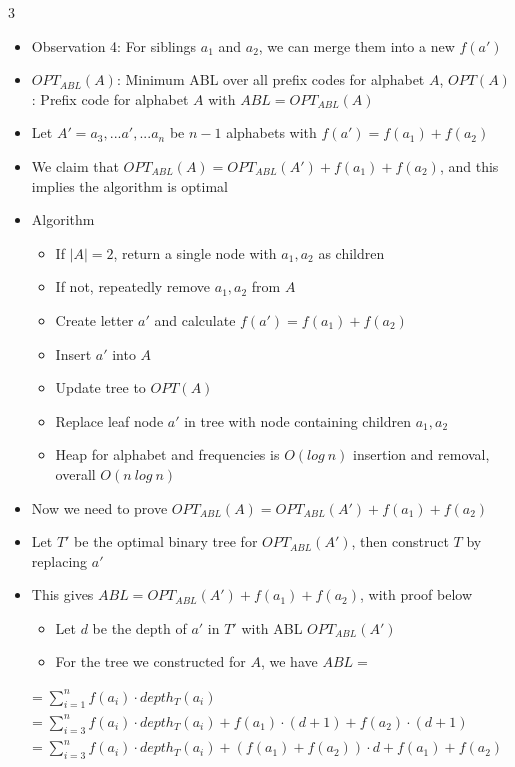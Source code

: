 \documentclass[10pt, landscape]{article}
\begin{document}
\begin{multicols*}{3}
\begin{itemize}
    \item Observation 4: For siblings $a_1$ and $a_2$, we can merge them into a new $f(a')$
    \item $OPT_{ABL}(A)$: Minimum ABL over all prefix codes for alphabet $A$, $OPT(A)$: Prefix code for alphabet $A$ with $ABL=OPT_{ABL}(A)$
    \item Let $A'=a_3,...a',...a_n$ be $n-1$ alphabets with $f(a')=f(a_1)+f(a_2)$
    \item We claim that $OPT_{ABL}(A)=OPT_{ABL}(A')+f(a_1)+f(a_2)$, and this implies the algorithm is optimal
    \item Algorithm
    \begin{itemize}
        \item If $|A|=2$, return a single node with $a_1,a_2$ as children
        \item If not, repeatedly remove $a_1, a_2$ from $A$
        \item Create letter $a'$ and calculate $f(a')=f(a_1)+f(a_2)$
        \item Insert $a'$ into $A$
        \item Update tree to $OPT(A)$
        \item Replace leaf node $a'$ in tree with node containing children $a_1, a_2$
        \item Heap for alphabet and frequencies is $O(log\ n)$ insertion and removal, overall $O(n\ log\ n)$
    \end{itemize}
    \item Now we need to prove $OPT_{ABL}(A)=OPT_{ABL}(A')+f(a_1)+f(a_2)$
    \item Let $T'$ be the optimal binary tree for $OPT_{ABL}(A')$, then construct $T$ by replacing $a'$
    \item This gives $ABL=OPT_{ABL}(A')+f(a_1)+f(a_2)$, with proof below
    \begin{itemize}
        \item Let $d$ be the depth of $a'$ in $T'$ with ABL $OPT_{ABL}(A')$
        \item For the tree we constructed for $A$, we have $ABL=$
    \end{itemize}
\end{itemize}
{\tiny
\begin{align*}
    &=\sum_{i=1}^n f(a_i) \cdot depth_T(a_i)\\
    &= \sum_{i=3}^n f(a_i) \cdot depth_T(a_i)+f(a_1) \cdot (d+1) + f(a_2) \cdot (d+1)\\
    &= \sum_{i=3}^n f(a_i)\cdot depth_T(a_i) + (f(a_1) + f(a_2)) \cdot d + f(a_1) + f(a_2) \\

\end{align*}}
\end{multicols*}
\end{document}
